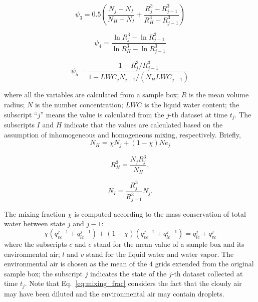 \documentclass[draft,jgrga]{AGUTeX}
\newcommand{\Eq}[1]{Eq.~\eqref{#1}} \newcommand{\Fig}[1]{Figure~\ref{#1}}
\begin{document}
\begin{article}
\begin{equation}
\psi_3 = 0.5(\frac{N_j-N_{I}}{N_H-N_I} + \frac{R_j^3-R_{j-1}^3}{R_H^3 - R_{j-1}^3})
\label{phi3}
\end{equation}

\begin{equation}
\psi_4 = \frac{\ln R_j^3 - \ln R_{j-1}^3}{\ln R_{H}^3 - \ln R_{j-1}^3}
\label{phi4}
\end{equation}

\begin{equation}
\psi_5 = \frac{1 - R_{j}^3/R_{j-1}^3}{1 - LWC_{j}N_{j-1}/(N_H LWC_{j-1})}
\label{phi5}
\end{equation}

where all the variables are calculated from a sample box; $R$ is the mean volume radius; $N$ is the number concentration; $LWC$ is the liquid water content; the subscript ``$j$'' means the value is calculated from the $j$-th dataset at time $t_j$. The subscripts $I$ and $H$ indicate that the values are calculated based on the assumption of inhomogeneous and homogeneous mixing, respectively. Briefly,
\begin{equation}
N_H = \chi N_j + (1 - \chi) Ne_j
\end{equation}

\begin{equation}
R_H^3 = \frac{N_jR_j^3}{N_H},
\end{equation}

\begin{equation}
N_I = \frac{R_j^3}{R_{j-1}^3}N_j.
\end{equation}

The mixing fraction $\chi$ is computed according to the mass conservation of total water between state $j$ and $j-1$:
\begin{equation}
\chi(q^{j-1}_{vc} + q^{j-1}_{lc}) + (1-\chi)(q^{j-1}_{ve} + q^{j-1}_{le}) = q^{j}_{lc} + q^{j}_{vc}
\label{eq:mixing_frac}
\end{equation}
where the subscripts $c$ and $e$ stand for the mean 
value of a sample box and its environmental air; $l$ and $v$ stand for the liquid 
water and water vapor. The environmental air is chosen as the mean of the $4$ 
grids extended from the original sample box; the subscript $j$ indicates the state of the $j$-th dataset 
collected at time $t_j$. Note that \Eq{eq:mixing_frac} considers the fact that the cloudy air may have 
been diluted and the environmental air may contain droplets.


\end{article}
\end{document}

